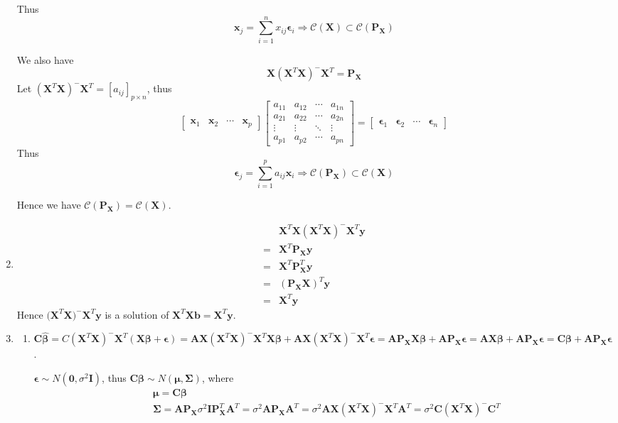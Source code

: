 \documentclass{article}
\begin{document}
\begin{enumerate}[leftmargin = 0 em, label = \arabic*., font = \bfseries]
	Thus 
	\[\bm x_{j} = \sum_{i = 1}^n x_{ij} \bm \epsilon_{i} \Rightarrow \mathcal{C}(\bm X) \subset \mathcal{C}(\bm P_{\bm X})\]

	We also have 
	\[\bm X (\bm X^T \bm X)^- \bm X^T = \bm P_{\bm X}\]
	Let $(\bm X^T \bm X)^- \bm X^T = [a_{ij}]_{p \times n}$, thus
	\[\begin{bmatrix}
		\bm x_1 & \bm x_2 & \cdots & \bm x_p
	\end{bmatrix}  \begin{bmatrix}
		a_{11} & a_{12} & \cdots & a_{1n}\\
		a_{21} & a_{22} & \cdots & a_{2n} \\
		\vdots & \vdots & \ddots & \vdots \\
		a_{p1} & a_{p2} & \cdots & a_{pn}
	\end{bmatrix} = \begin{bmatrix}
		\bm \epsilon_{1} & \bm \epsilon_{2} & \cdots & \bm \epsilon_{n}
	\end{bmatrix}\]
	Thus 
	\[\bm \epsilon_{j} = \sum_{i = 1}^p a_{ij} \bm x_{i} \Rightarrow \mathcal{C}(\bm P_{\bm X}) \subset \mathcal{C}(\bm X)\]

	Hence we have $\mathcal{C}(\bm P_{\bm X}) = \mathcal{C}(\bm X).$


	\item 
	\begin{align*}
	& \bm X^T \bm X (\bm X^T \bm X)^{-}\bm X^T\bm y \\
	 =& \bm X^T \bm P_{\bm X}\bm y \\
	 = &\bm X^T \bm P_{\bm X}^T \bm y\\
	 = &(\bm P_{\bm X} \bm X)^T \bm y\\
	 = &\bm X^T \bm y 
	\end{align*}
	Hence $\bm (\bm X^T \bm X)^{-} \bm X^T \bm y$ is a solution of $\bm X^T \bm X \bm b = \bm X^T \bm y$.


	\item 
	\begin{enumerate}
		\item 
		$\bm C \hat{\bm \beta} = C (\bm X^T \bm X)^- \bm X^T (\bm X \bm \beta + \bm \epsilon) = \bm A \bm X (\bm X^T \bm X)^- \bm X^T \bm X \bm \beta + \bm A \bm X (\bm X^T \bm X)^- \bm X^T \bm \epsilon = \bm A \bm P_{\bm X} \bm X \bm \beta + \bm A \bm P_{\bm X} \bm \epsilon = \bm A \bm X \bm \beta + \bm A \bm P_{\bm X} \bm \epsilon = \bm C \bm \beta + \bm A \bm P_{\bm X} \bm \epsilon$.

		$\bm \epsilon \sim N(\bm 0, \sigma^2 \bm I)$, thus $\bm C \bm \beta \sim N(\bm \mu , \bm \Sigma)$, where
		\begin{align*}
		&\bm \mu = \bm C \bm \beta\\
		&\bm \Sigma = \bm A \bm P_{\bm X} \sigma^2 \bm I \bm P_{\bm X}^T \bm A^T = \sigma^2 \bm A \bm P_{\bm X}\bm A^T = \sigma^2 \bm A \bm X(\bm X^T \bm X)^- \bm X^T \bm A^T = \sigma^2 \bm C (\bm X^T \bm X)^- \bm C^T
		\end{align*}



\end{enumerate}
\end{enumerate}
\end{document}
